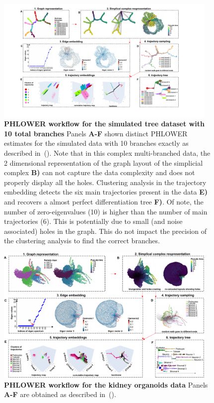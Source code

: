 \begin{figure}[!ht]
  \centering
  \includegraphics[width=0.95\textwidth]{DLA10_PHLOWER/fig}
  \vspace{0.1cm}
  \caption[Workflow for DLA simulated data.]{\textbf{PHLOWER workflow for the simulated tree dataset with 10 total branches} Panels \textbf{A-F} shown distinct PHLOWER estimates for the simulated data with 10 branches exactly as described in~(). Note that in this complex multi-branched data, the 2 dimensional representation of the graph layout of the simplicial complex \textbf{B)} can not capture the data complexity and does not properly display all the holes. Clustering analysis in the trajectory embedding detects the six main trajectories present in the data \textbf{E)} and recovers a almost perfect differentiation tree \textbf{F)}. Of note, the number of zero-eigenvalues (10) is higher than the number of main trajectories (6).  This is potentially due to small (and noise associated) holes in the graph. This do not impact the precision of the clustering analysis to find the correct branches.}
  \label{supfig:dla10-workflow}
\end{figure}


\begin{figure}[!ht]
  \centering
  \includegraphics[width=0.95\textwidth]{kidney_PHLOWER//fig}
  \vspace{0.1cm}
  \caption[Kidney organoid PHLOWER workflow.]{\textbf{PHLOWER workflow for the kidney organoids data} Panels \textbf{A-F} are obtained as described in~(). }
  \label{supfig:kidney-workflow}
\end{figure}







